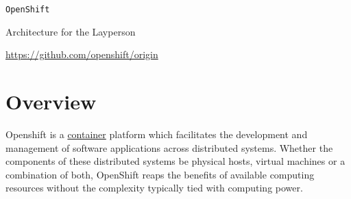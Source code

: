 \documentclass{article}
\begin{document}
\centerline{\texttt{OpenShift}}
\centerline{\sc Architecture for the Layperson }
\centerline{\url{https://github.com/openshift/origin}}

\vspace{1pc}

\section{Overview}
\hspace{3pc} Openshift is a \href{https://kyguy.github.io/src/containers/containers.html}{container} platform which facilitates the development and management of software applications across
distributed systems. Whether the components of these distributed systems be physical hosts, virtual machines or a combination of 
both, OpenShift reaps the benefits of available computing resources without the complexity typically tied with computing power. 
\end{document}

